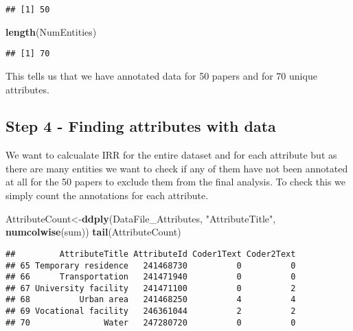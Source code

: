 \documentclass[]{article}
\newenvironment{Shaded}{\begin{snugshade}}{\end{snugshade}}
\newcommand{\KeywordTok}[1]{\textcolor[rgb]{0.13,0.29,0.53}{\textbf{#1}}}
\newcommand{\StringTok}[1]{\textcolor[rgb]{0.31,0.60,0.02}{#1}}
\newcommand{\OperatorTok}[1]{\textcolor[rgb]{0.81,0.36,0.00}{\textbf{#1}}}
\newcommand{\NormalTok}[1]{#1}
\begin{document}
\begin{Shaded}
\end{Shaded}

\begin{verbatim}
## [1] 50
\end{verbatim}

\begin{Shaded}
\begin{Highlighting}[]
\KeywordTok{length}\NormalTok{(NumEntities)}
\end{Highlighting}
\end{Shaded}

\begin{verbatim}
## [1] 70
\end{verbatim}

This tells us that we have annotated data for 50 papers and for 70
unique attributes.

\subsection{Step 4 - Finding attributes with
data}\label{step-4---finding-attributes-with-data}

We want to calcualate IRR for the entire dataset and for each attribute
but as there are many entities we want to check if any of them have not
been annotated at all for the 50 papers to exclude them from the final
analysis. To check this we simply count the annotations for each
attribute.

\begin{Shaded}
\begin{Highlighting}[]
\NormalTok{AttributeCount<-}\KeywordTok{ddply}\NormalTok{(DataFile_Attributes, }\StringTok{"AttributeTitle"}\NormalTok{, }\KeywordTok{numcolwise}\NormalTok{(sum))}
\KeywordTok{tail}\NormalTok{(AttributeCount)}
\end{Highlighting}
\end{Shaded}

\begin{verbatim}
##         AttributeTitle AttributeId Coder1Text Coder2Text
## 65 Temporary residence   241468730          0          0
## 66      Transportation   241471940          0          0
## 67 University facility   241471100          0          2
## 68          Urban area   241468250          4          4
## 69 Vocational facility   246361044          2          2
## 70               Water   247280720          0          0
\end{verbatim}
\end{document}
